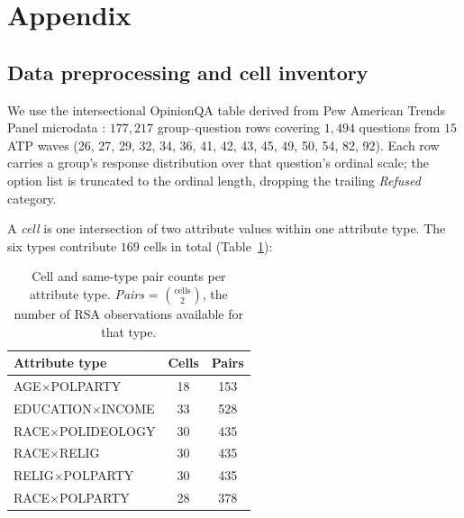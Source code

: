 \section{Appendix}

\subsection{Data preprocessing and cell inventory}
\label{app:data}
We use the intersectional OpinionQA table derived from Pew American Trends
Panel microdata \citep{opinionqa2023, subpop2025}: $177{,}217$
group--question rows covering $1{,}494$ questions from $15$ ATP waves
(26, 27, 29, 32, 34, 36, 41, 42, 43, 45, 49, 50, 54, 82, 92). Each row
carries a group's response distribution over that question's ordinal
scale; the option list is truncated to the ordinal length, dropping the
trailing \textit{Refused} category.

A \emph{cell} is one intersection of two attribute values within one
attribute type. The six types contribute $169$ cells in total
(Table~\ref{tab:cellinventory}):

\begin{table}[h]
\centering
\begin{tabular}{lcc}
\toprule
Attribute type & Cells & Pairs \\
\midrule
AGE$\times$POLPARTY      & 18 & 153 \\
EDUCATION$\times$INCOME  & 33 & 528 \\
RACE$\times$POLIDEOLOGY  & 30 & 435 \\
RACE$\times$RELIG        & 30 & 435 \\
RELIG$\times$POLPARTY    & 30 & 435 \\
RACE$\times$POLPARTY     & 28 & 378 \\
\bottomrule
\end{tabular}
\caption{Cell and same-type pair counts per attribute type. \emph{Pairs}
= $\binom{\text{cells}}{2}$, the number of RSA observations available for
that type.}
\label{tab:cellinventory}
\end{table}

